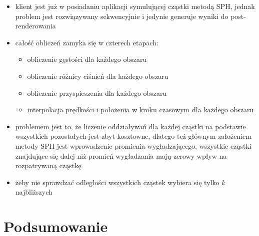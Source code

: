 \documentclass[polish, 12pt]{aghthesis}
\begin{document}
			\begin{itemize}
			
				\item klient jest już w posiadaniu aplikacji symulującej cząstki metodą SPH, jednak problem jest rozwiązywany sekwencyjnie i jedynie generuje wyniki do post-renderowania
				\item całość obliczeń zamyka się w czterech etapach:
				\begin{itemize}
				
					\item obliczenie gęstości dla każdego obszaru
					\item obliczenie różnicy ciśnień dla każdego obszaru
					\item obliczenie przyspieszenia dla każdego obszaru
					\item interpolacja prędkości i położenia w kroku czasowym dla każdego obszaru
				
				\end{itemize}
				\item problemem jest to, że liczenie oddziaływań dla każdej cząstki na podstawie wszystkich pozostałych jest zbyt kosztowne, dlatego też głównym założeniem metody SPH jest wprowadzenie promienia wygładzającego, wszystkie cząstki znajdujące się dalej niż promień wygładzania mają zerowy wpływ na rozpatrywaną cząstkę
				\item żeby nie sprawdzać odległości wszystkich cząstek wybiera się tylko $k$ najbliższych 
			
			\end{itemize}

\section{Podsumowanie}
\end{document}
